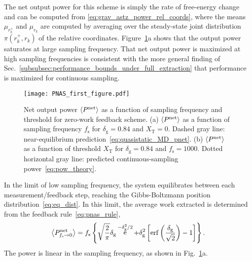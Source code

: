 \documentclass[%
reprint,
bibnotes, amsmath, amssymb, aps, pre,
 showkeys,
floatfix
]{revtex4-2}
\newcommand{\mrm}{\mathrm}
\newcommand{\pr}[1]{\left(#1\right)} %
\newcommand{\sr}[1]{\left[#1\right]} %
\newcommand{\br}[1]{\left\{#1\right\}} %
\newcommand{\dg}{\delta_{\mrm{g}}}
\newcommand{\fs}{f_{\mrm{s}}}
\newcommand{\xkr}{r_{k}}
\newcommand{\xkpr}{r_{k}^{+}}
\newcommand{\epn}{\ev{P^{\mrm{net}}}}
\newcommand{\xT}{X_{\mrm{T}}}
\DeclareMathOperator{\e}{e}
\begin{document}
The net output power for this scheme is simply the rate of free-energy change and can be computed from \eqref{eq:grav_astz_power_rel_coords}, where the means $\mu_{\xkpr}$ and $\mu_{\xkr}$ are computed by averaging over the steady-state joint distribution $\pi\pr{\xkpr,\xkr}$ of the relative coordinates. 
Figure~\ref{fig:pnas_fig}a shows that the output power saturates at large sampling frequency. 
That net output power is maximized at high sampling frequencies is consistent with the more general finding of Sec.~\ref{subsubsec:performance_bounds_under_full_extraction} that performance is maximized for continuous sampling.

\begin{figure}[ht!]
    \centering
    \texttt{[image: PNAS\_first\_figure.pdf]}
    \caption{
        Net output power $\epn$ as a function of sampling frequency and threshold for zero-work feedback scheme.
        (a) $\epn$ as a function of sampling frequency $\fs$ for $\dg=0.84$ and $\xT = 0$. 
        Dashed gray line: near-equilibrium prediction~\eqref{eq:quasistatic_MD_pnet}.
        (b) $\epn$ as a function of threshold $\xT$ for $\dg=0.84$ and $\fs = 1000$.
        Dotted horizontal gray line: predicted continuous-sampling power~\eqref{eq:pow_theory}.
        }
    \label{fig:pnas_fig}
\end{figure}

In the limit of low sampling frequency, the system equilibrates between each measurement/feedback step, reaching the Gibbs-Boltzmann position distribution~\eqref{eq:eq_dist}.
In this limit, the average work extracted is determined from the feedback rule~\eqref{eq:pnas_rule},
\begin{align}
    \ev{P^{\mrm{net}}_{\fs\to 0}}  = \fs \br{\sqrt{\frac{2}{\pi}}\dg\e^{-\dg^{2}/2} + \dg^{2}\sr{\erf\pr{\frac{\dg}{\sqrt{2}}}-1}}.\label{eq:quasistatic_MD_pnet}
\end{align}
The power is linear in the sampling frequency, as shown in Fig.~\ref{fig:pnas_fig}a.
\end{document}
